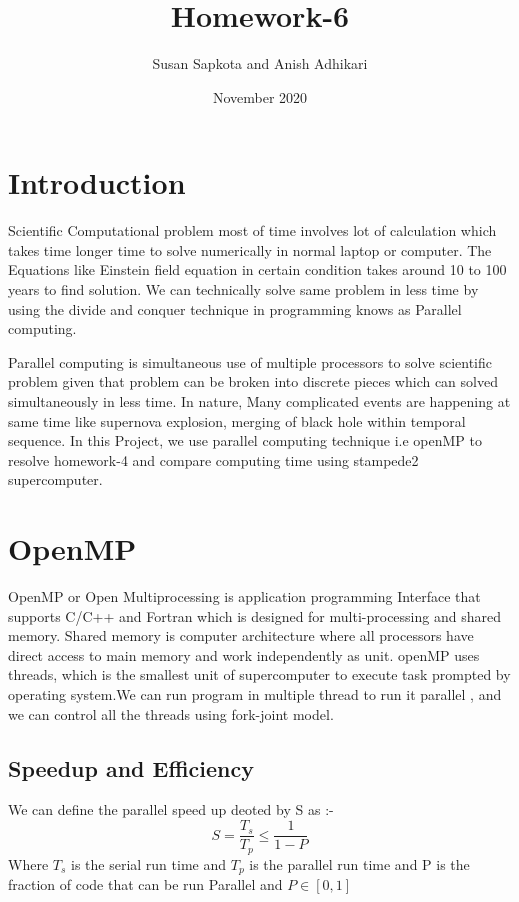 \documentclass{article}
\title{Homework-6}
\author{Susan Sapkota and Anish Adhikari}
\date{November 2020}
\begin{document}
\maketitle

\section{Introduction}
Scientific Computational problem most of time involves lot of calculation which takes time longer time to solve numerically in normal laptop or computer. The Equations like Einstein field equation in certain condition takes around 10 to 100 years to find solution. We can technically solve same problem in less time by using the divide and conquer technique in programming knows as Parallel computing.

Parallel computing is simultaneous use of multiple processors to solve scientific problem given that problem can be broken into discrete pieces which can solved simultaneously in less time. In nature, Many complicated events are happening at same time like supernova explosion, merging of black hole within temporal sequence. In this Project, we use parallel computing technique i.e openMP to resolve homework-4 and compare computing time using stampede2 supercomputer. 

\section{OpenMP}
OpenMP or Open Multiprocessing is application programming Interface that supports C/C++ and Fortran which is designed for multi-processing and shared memory. Shared memory is computer architecture where all processors have direct access to main memory and work independently as unit. openMP uses threads, which is the smallest unit of supercomputer to execute task prompted by operating system.We can run program in multiple thread to run it parallel , and we can control all the threads using fork-joint model.
\subsection{Speedup and Efficiency}

We can define the parallel speed up deoted by S as :-
\begin{equation}
     S= \frac{T_s}{T_p}  \leq \frac{1}{1-P}
\end{equation}
     Where $T_{s}$ is the serial run time and $T_{p}$ is the parallel run time and P is the fraction of code that can be run Parallel and $P\in[0,1]$\newline
     
\end{document}
